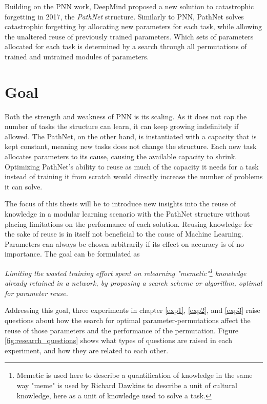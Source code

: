 Building on the PNN work, DeepMind proposed a new solution to catastrophic forgetting in 2017, the \emph{PathNet} structure\cite{pathnet}. Similarly to PNN, PathNet solves catastrophic forgetting by allocating new parameters for each task, while allowing the unaltered reuse of previously trained parameters. Which sets of parameters allocated for each task is determined by a search through all permutations of trained and untrained modules of parameters.

\section{Goal}
Both the strength and weakness of PNN is its scaling. As it does not cap the number of tasks the structure can learn, it can keep growing indefinitely if allowed. The PathNet, on the other hand, is instantiated with a capacity that is kept constant, meaning new tasks does not change the structure. Each new task allocates parameters to its cause, causing the available capacity to shrink. Optimizing PathNet's ability to reuse as much of the capacity it needs for a task instead of training it from scratch would directly increase the number of problems it can solve. 

The focus of this thesis will be to introduce new insights into the reuse of knowledge in a modular learning scenario with the PathNet structure\cite{pathnet} without placing limitations on the performance of each solution. Reusing knowledge for the sake of reuse is in itself not beneficial to the cause of Machine Learning. Parameters can always be chosen arbitrarily if its effect on accuracy is of no importance. The goal can be formulated as 

\begin{center}
    \emph{Limiting the wasted training effort spent on relearning "memetic"\footnote{Memetic is used here to describe a quantification of knowledge in the same way "meme" is used by Richard Dawkins\cite{selfishGene} to describe a unit of cultural knowledge, here as a unit of knowledge used to solve a task.} knowledge already retained in a network, by proposing a search scheme or algorithm, optimal for parameter reuse.} 
\end{center}
\noindent
Addressing this goal, three experiments in chapter \ref{exp1}, \ref{exp2}, and \ref{exp3} raise questions about how the search for optimal parameter-permutations affect the reuse of those parameters and the performance of the permutation. Figure \ref{fig:research_questions} shows what types of questions are raised in each experiment, and how they are related to each other. 

